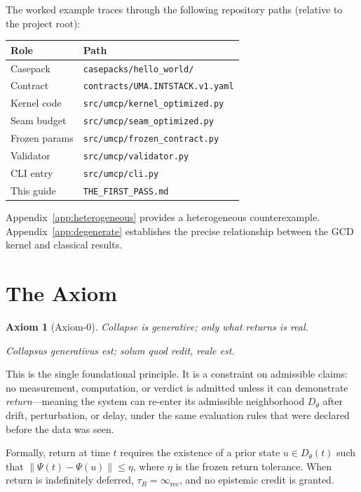 \documentclass[
  aps,
  prd,
  twocolumn,
  superscriptaddress,
  nofootinbib,
  floatfix
]{revtex4-2}
\newtheorem*{axiom}{Axiom}
\newcommand{\tR}{\tau_{\!R}}
\newcommand{\IR}{\infty_{\mathrm{rec}}}
\begin{document}
The worked example traces through the following repository paths
(relative to the project root):
\begin{center}
\small
\begin{tabular}{@{}ll@{}}
  \toprule
  \textbf{Role} & \textbf{Path} \\
  \midrule
  Casepack      & \texttt{casepacks/hello\_world/} \\
  Contract      & \texttt{contracts/UMA.INTSTACK.v1.yaml} \\
  Kernel code   & \texttt{src/umcp/kernel\_optimized.py} \\
  Seam budget   & \texttt{src/umcp/seam\_optimized.py} \\
  Frozen params & \texttt{src/umcp/frozen\_contract.py} \\
  Validator     & \texttt{src/umcp/validator.py} \\
  CLI entry     & \texttt{src/umcp/cli.py} \\
  This guide    & \texttt{THE\_FIRST\_PASS.md} \\
  \bottomrule
\end{tabular}
\end{center}

Appendix~\ref{app:heterogeneous} provides a heterogeneous
counterexample.  Appendix~\ref{app:degenerate} establishes the
precise relationship between the GCD kernel and classical results.

\section{The Axiom}\label{sec:axiom}

\begin{axiom}[Axiom-0]
\emph{Collapse is generative; only what returns is real.}

\emph{Collapsus generativus est; solum quod redit, reale est.}
\end{axiom}

This is the single foundational principle.  It is a constraint on
admissible claims: no measurement, computation, or verdict is
admitted unless it can demonstrate \emph{return}---meaning the system
can re-enter its admissible neighborhood $D_\theta$ after drift,
perturbation, or delay, under the same evaluation rules that were
declared before the data was seen.

Formally, return at time $t$ requires the existence of a prior
state $u \in D_\theta(t)$ such that
$\|\Psi(t) - \Psi(u)\| \leq \eta$, where $\eta$ is the frozen
return tolerance.  When return is indefinitely deferred,
$\tR = \IR$, and no epistemic credit is granted.
\end{document}
